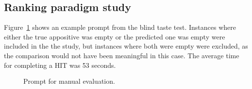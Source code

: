 \subsection{Ranking paradigm study}
\label{taste_test}
Figure~\ref{fig:tastetest} shows an example prompt from the blind taste test. Instances where either the true appositive was empty or the predicted one was empty were included in the the study, but instances where both were empty were excluded, as the comparison would not have been meaningful in this case. The average time for completing a HIT was 53 seconds.
\begin{figure}
    \centering
    \caption{Prompt for manual evaluation.}
    \label{fig:tastetest}
\end{figure}